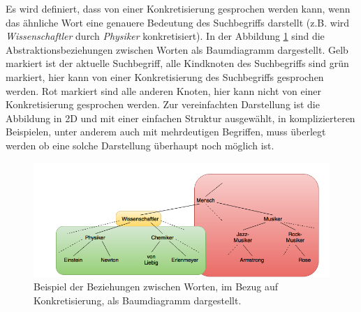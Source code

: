 \documentclass[12pt,a4paper]{report}
\begin{document}
				Es wird definiert, dass von einer Konkretisierung gesprochen werden kann, wenn das ähnliche Wort eine genauere Bedeutung des Suchbegriffs darstellt (z.B. wird \textit{Wissenschaftler} durch \textit{Physiker} konkretisiert). In der Abbildung \ref{pic:Konkretisierung} sind die Abstraktionsbeziehungen zwischen Worten als Baumdiagramm dargestellt. Gelb markiert ist der aktuelle Suchbegriff, alle Kindknoten des Suchbegriffs sind grün markiert, hier kann von einer Konkretisierung des Suchbegriffs gesprochen werden. Rot markiert sind alle anderen Knoten, hier kann nicht von einer Konkretisierung gesprochen werden. Zur vereinfachten Darstellung ist die Abbildung in 2D und mit einer einfachen Struktur ausgewählt, in komplizierteren Beispielen, unter anderem auch mit mehrdeutigen Begriffen, muss überlegt werden ob eine solche Darstellung überhaupt noch möglich ist.\\
		
\begin{figure}[h]
  \begin{center}
	\includegraphics[scale=0.55]{Konkretisierung_Baum2.png}
  \end{center}  
  \caption{Beispiel der Beziehungen zwischen Worten, im Bezug auf Konkretisierung, als Baumdiagramm dargestellt.}
  \label{pic:Konkretisierung}
\end{figure}
		
\end{document}
